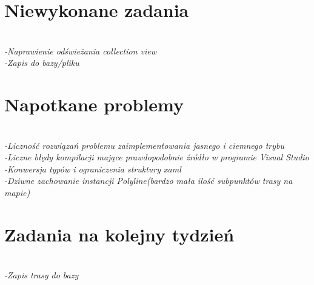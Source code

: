 \documentclass[12pt,a4paper]{mwart}
\begin{document}
\section{Niewykonane zadania}
\textit{\\
-Naprawienie odświeżania collection view\\
-Zapis do bazy/pliku\\
} %

\section{Napotkane problemy}
\textit{\\
-Liczność rozwiązań problemu zaimplementowania jasnego i ciemnego trybu \\
-Liczne błędy kompilacji mające prawdopodobnie źródło w programie Visual Studio\\
-Konwersja typów i ograniczenia struktury xaml\\
-Dziwne zachowanie instancji Polyline(bardzo mała ilość subpunktów trasy na mapie)\\
} %

\section{Zadania na kolejny tydzień}
\textit{\\
-Zapis trasy do bazy\\
} %
\end{document}
